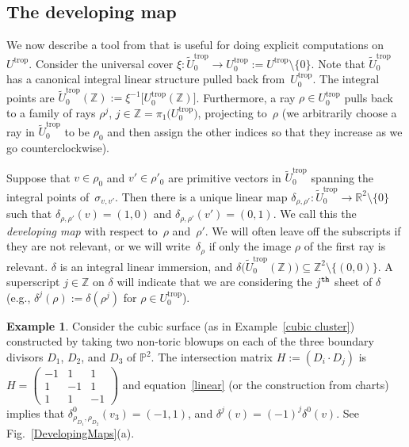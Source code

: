 \documentclass[10pt,a4paper]{amsart}
\numberwithin{equation}{section}
\numberwithin{figure}{section}
\numberwithin{table}{section}
\DeclareMathOperator{\trop}{trop}
\let\bb=\mathbb
\let\rar=\rightarrow
\let\wt=\widetilde
\theoremstyle{definition}
\newtheorem{eg}[thm]{Example}
\begin{document}
\subsection{The developing map}\label{dev}

We now describe a tool from \cite{GHK1} that is useful for doing explicit computations on $U^{\trop}$. Consider the universal cover $\xi\colon \wt{U}_0^{\trop} \rar U^{\trop}_0:=U^{\trop}\setminus \{0\}$. Note that $\wt{U}_0^{\trop}$ has a canonical integral linear structure pulled back from~$U^{\trop}_0$. The integral points are $\wt{U}_0^{\trop}(\bb{Z}) := \xi^{-1}\big[U^{\trop}_0(\bb{Z})\big]$. Furthermore, a ray $\rho\in U^{\trop}_0$ pulls back to a family of rays $\rho^j$, $j\in \bb{Z}=\pi_1\big(U^{\trop}_0\big)$, projecting to~$\rho$ (we arbitrarily choose a ray in $\wt{U}_0^{\trop}$ to be $\rho_0$ and then assign the other indices so that they increase as we go counterclockwise).

Suppose that $v \in \rho_0$ and $v' \in \rho'_0$ are primitive vectors in $\wt{U}_0^{\trop}$ spanning the integral points of~$\sigma_{v,v'}$.
 Then there is a unique linear map $\delta_{\rho,\rho'}\colon \wt{U}_0^{\trop} \rar \bb{R}^2\setminus\{0\}$ such that $\delta_{\rho,\rho'}(v)=(1,0)$ and $\delta_{\rho,\rho'}(v')=(0,1)$. We call this the {\it developing map} with respect to~$\rho$ and~$\rho'$.
 We will often leave off the subscripts if they are not relevant, or we will write~$\delta_{\rho}$ if only
the image $\rho$ of the first ray is relevant. $\delta$ is an integral linear immersion, and $\delta\big(\wt{U}_0^{\trop}(\bb{Z})\big) \subseteq \bb{Z}^2\setminus \{(0,0)\}$. A superscript $j\in \bb{Z}$ on $\delta$ will indicate that we are considering the $j^{\tt{th}}$ sheet of $\delta$ (e.g., $\delta^j(\rho):=\delta(\rho^j)$ for $\rho\in U^{\trop}_0$).

\begin{eg} \label{cubicdevelop}
Consider the cubic surface (as in Example~\ref{cubic cluster}) constructed by taking two non-toric blowups on each of the three boundary divisors $D_1$, $D_2$, and $D_3$ of $\bb{P}^2$. The intersection matrix $H:=(D_i \cdot D_j)$ is $
H=	\left(\begin{smallmatrix}
		-1 &1 & 1 \\
		1 &-1 & 1 \\
		1 &1 & -1
		\end{smallmatrix}\right)
$
and equation~\eqref{linear} (or the construction from charts) implies that $\delta^0_{\rho_{D_1},\rho_{D_2}}(v_3) = (-1,1)$, and $\delta^j(v) = (-1)^j\delta^0(v)$. See Fig.~\ref{DevelopingMaps}(a).
\end{eg}
\end{document}
